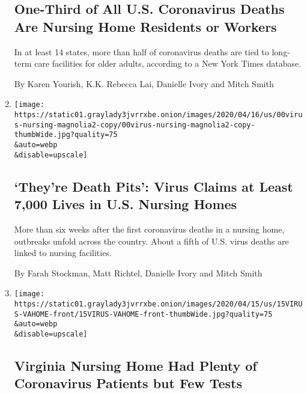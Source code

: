 \begin{enumerate}
  \hypertarget{one-third-of-all-us-coronavirus-deaths-are-nursing-home-residents-or-workers}{%
  \subsection{One-Third of All U.S. Coronavirus Deaths Are Nursing Home
  Residents or
  Workers}\label{one-third-of-all-us-coronavirus-deaths-are-nursing-home-residents-or-workers}}

  In at least 14 states, more than half of coronavirus deaths are tied
  to long-term care facilities for older adults, according to a New York
  Times database.

  By Karen Yourish, K.K. Rebecca Lai, Danielle Ivory and Mitch Smith
\item
  \href{/2020/04/17/us/coronavirus-nursing-homes.html}{}

  \texttt{[image: https://static01.graylady3jvrrxbe.onion/images/2020/04/16/us/00virus-nursing-magnolia2-copy/00virus-nursing-magnolia2-copy-thumbWide.jpg?quality=75\\\&auto=webp\\\&disable=upscale]}

  \hypertarget{theyre-death-pits-virus-claims-at-least-7000-lives-in-us-nursing-homes}{%
  \subsection{`They're Death Pits': Virus Claims at Least 7,000 Lives in
  U.S. Nursing
  Homes}\label{theyre-death-pits-virus-claims-at-least-7000-lives-in-us-nursing-homes}}

  More than six weeks after the first coronavirus deaths in a nursing
  home, outbreaks unfold across the country. About a fifth of U.S. virus
  deaths are linked to nursing facilities.

  By Farah Stockman, Matt Richtel, Danielle Ivory and Mitch Smith
\item
  \href{/2020/04/15/us/virginia-nursing-home-coronavirus.html}{}

  \texttt{[image: https://static01.graylady3jvrrxbe.onion/images/2020/04/15/us/15VIRUS-VAHOME-front/15VIRUS-VAHOME-front-thumbWide.jpg?quality=75\\\&auto=webp\\\&disable=upscale]}

  \hypertarget{virginia-nursing-home-had-plenty-of-coronavirus-patients-but-few-tests}{%
  \subsection{Virginia Nursing Home Had Plenty of Coronavirus Patients
  but Few
  Tests}\label{virginia-nursing-home-had-plenty-of-coronavirus-patients-but-few-tests}}


\end{enumerate}
